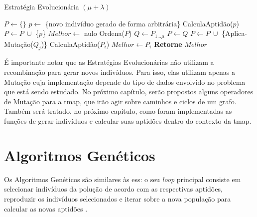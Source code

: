 \begin{algorithm}                      %
	\caption{Estratégia Evolucionária $( \mu + \lambda )$}          %
	\label{mu+lambda_es}                           %
	\begin{algorithmic}                    %
		\State $P \gets \{\} $
			\State $p \gets$ \{novo indivíduo gerado de forma arbitrária\}
			\State CalculaAptidão($p$)
			\State $P \gets P \ \cup $ \{$p$\} 
		\EndFor
			\State $Melhor \gets$ nulo
		\Repeat
			\State Ordena($P$) 
			\State $Q \gets P_{1...\mu}$ 
			\State $P \gets Q$ 
					\State $P \gets P \ \cup $ \{Aplica-Mutação($Q_{j}$)\}
				\EndFor
			\EndFor
				\State CalculaAptidão($P_{i}$)
					\State $Melhor \gets P_{i}$
				\EndIf
			\EndFor
		\State \textbf{Retorne} $Melhor$
		\EndProcedure
	\end{algorithmic}
\end{algorithm}

É importante notar que as Estratégias Evolucionárias não utilizam a recombinação 
para gerar novos indivíduos. Para isso, elas utilizam apenas a Mutação cuja 
implementação depende do tipo de dados envolvido no problema que está sendo 
estudado. No próximo capítulo, serão propostos alguns operadores de Mutação para 
a \ac{tmap}, que irão agir sobre caminhos e ciclos de um grafo. Também será 
tratado, no próximo capítulo, como foram implementadas as funções de gerar 
indivíduos e calcular suas aptidões dentro do contexto da \ac{tmap}.

\section{Algoritmos Genéticos}

Os Algoritmos Genéticos são similares às \acp{es}: o seu \textit{loop} principal 
consiste em selecionar indivíduos da polução de acordo com as respectivas 
aptidões, reproduzir os indivíduos selecionados e iterar sobre a nova população 
para calcular as novas aptidões \citep{Luke2013Metaheuristics}.

